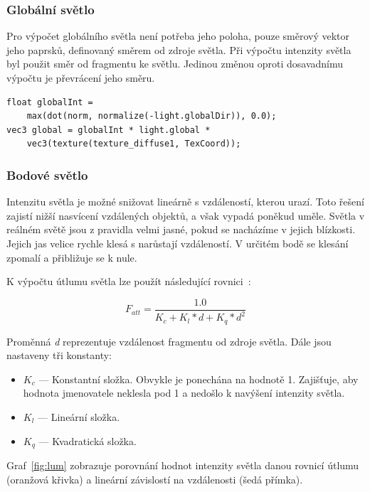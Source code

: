 \documentclass[thesis=M,czech]{FITthesis}[2019/12/23]
\begin{document}
\subsubsection{Globální světlo}

Pro výpočet globálního světla není potřeba jeho poloha, pouze směrový vektor jeho paprsků, definovaný směrem od zdroje světla. Při výpočtu intenzity světla byl použit směr od fragmentu ke světlu. Jedinou změnou oproti dosavadnímu výpočtu je převrácení jeho směru.

\begin{verbatim}
float globalInt = 
    max(dot(norm, normalize(-light.globalDir)), 0.0);
vec3 global = globalInt * light.global * 
    vec3(texture(texture_diffuse1, TexCoord));
\end{verbatim}

\subsubsection{Bodové světlo}

Intenzitu světla je možné snižovat lineárně s vzdáleností, kterou urazí. Toto řešení zajistí nižší nasvícení vzdálených objektů, a však vypadá poněkud uměle. Světla v reálném světě jsou z pravidla velmi jasné, pokud se nacházíme v jejich blízkosti. Jejich jas velice rychle klesá s narůstají vzdáleností. V určitém bodě se klesání zpomalí a přibližuje se k nule.

K výpočtu útlumu světla lze použít následující rovnici~\cite{lopgl_light_casters}:

$$ F_{att} = \frac{1.0}{K_c + K_l * d + K_q * d^2} $$

Proměnná \textit{d} reprezentuje vzdálenost fragmentu od zdroje světla. Dále jsou nastaveny tři konstanty:

\begin{itemize}
\item $K_c$ --- Konstantní složka. Obvykle je ponechána na hodnotě 1. Zajišťuje, aby hodnota jmenovatele neklesla pod 1 a nedošlo k navýšení intenzity světla.

\item $K_l$ --- Lineární složka. 

\item $K_q$ --- Kvadratická složka.
\end{itemize}

Graf~\ref{fig:lum} zobrazuje porovnání hodnot intenzity světla danou rovnicí útlumu (oranžová křivka) a lineární závislostí na vzdálenosti (šedá přímka).
\end{document}
